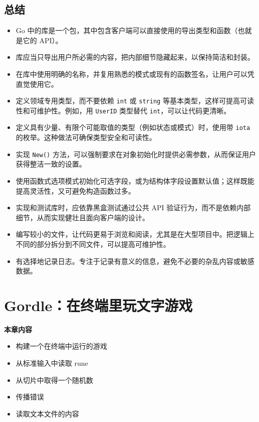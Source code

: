 \section*{总结}

\begin{itemize}
  \item Go 中的库是一个包，其中包含客户端可以直接使用的导出类型和函数（也就是它的 API）。
  \item 库应当只导出用户所必需的内容，把内部细节隐藏起来，以保持简洁和封装。
  \item 在库中使用明确的名称，并复用熟悉的模式或现有的函数签名，让用户可以凭直觉使用它。
  \item 定义领域专用类型，而不要依赖 \texttt{int} 或 \texttt{string} 等基本类型，这样可提高可读性和可维护性。例如，用 \texttt{UserID} 类型替代 \texttt{int}，可以让代码更清晰。
  \item 定义具有少量、有限个可能取值的类型（例如状态或模式）时，使用带 \texttt{iota} 的枚举。这种做法可确保类型安全和可读性。
  \item 实现 \texttt{New()} 方法，可以强制要求在对象初始化时提供必需参数，从而保证用户获得整洁一致的设置。
  \item 使用函数式选项模式初始化可选字段，或为结构体字段设置默认值；这样既能提高灵活性，又可避免构造函数过多。
  \item 实现和测试库时，应依靠黑盒测试通过公共 API 验证行为，而不是依赖内部细节，从而实现健壮且面向客户端的设计。
  \item 编写较小的文件，让代码更易于浏览和阅读，尤其是在大型项目中。把逻辑上不同的部分拆分到不同文件，可以提高可维护性。
  \item 有选择地记录日志。专注于记录有意义的信息，避免不必要的杂乱内容或敏感数据。
\end{itemize}

\chapter{Gordle：在终端里玩文字游戏}

\textbf{本章内容}

\begin{itemize}
  \item 构建一个在终端中运行的游戏
  \item 从标准输入中读取 rune
  \item 从切片中取得一个随机数
  \item 传播错误
  \item 读取文本文件的内容
\end{itemize}

